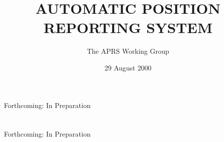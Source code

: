 \documentclass{report}
\title{AUTOMATIC POSITION REPORTING SYSTEM}
\date{29 August 2000}
\author{The APRS Working Group}
\begin{document}
\maketitle
\tableofcontents


 


 

 \tableofcontents


 


 


 


 

















% 
\chapter{}
Forthcoming: In Preparation

% 
\chapter{}
Forthcoming: In Preparation
\end{document}
